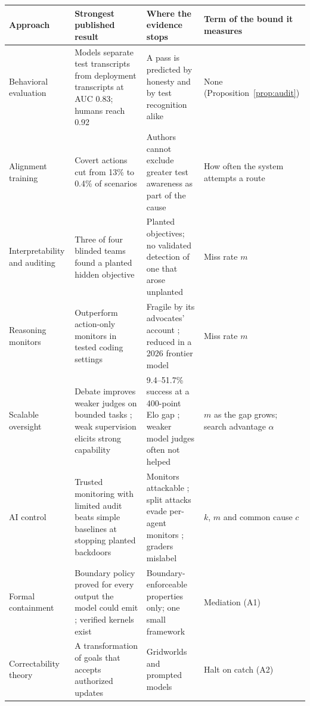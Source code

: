 \documentclass[10pt,twocolumn]{article}
\theoremstyle{plain}
\theoremstyle{definition}
\begin{document}
\begin{table}[t]
\centering
\footnotesize
\setlength{\tabcolsep}{5pt}
\renewcommand{\arraystretch}{1.16}
\begin{tabularx}{\textwidth}{@{}P{1.05in}LLP{1.0in}@{}}
\toprule
\textbf{Approach} & \textbf{Strongest published result} & \textbf{Where the evidence stops} & \textbf{Term of the bound it measures}\\
\midrule
Behavioral evaluation & Models separate test transcripts from deployment transcripts at AUC 0.83; humans reach 0.92 \cite{needham2025} & A pass is predicted by honesty and by test recognition alike \cite{schoen2025} & None (Proposition~\ref{prop:audit})\\
Alignment training & Covert actions cut from 13\% to 0.4\% of scenarios \cite{schoen2025} & Authors cannot exclude greater test awareness as part of the cause & How often the system attempts a route\\
Interpretability and auditing & Three of four blinded teams found a planted hidden objective \cite{marks2025} & Planted objectives; no validated detection of one that arose unplanted & Miss rate $m$\\
Reasoning monitors & Outperform action-only monitors in tested coding settings \cite{baker2025} & Fragile by its advocates' account \cite{korbak2025}; reduced in a 2026 frontier model \cite{openai2026astra} & Miss rate $m$\\
Scalable oversight & Debate improves weaker judges on bounded tasks \cite{khan2024,irving2018}; weak supervision elicits strong capability \cite{burns2024} & 9.4--51.7\% success at a 400-point Elo gap \cite{engels2025}; weaker model judges often not helped \cite{carro2026} & $m$ as the gap grows; search advantage $\alpha$\\
AI control & Trusted monitoring with limited audit beats simple baselines at stopping planted backdoors \cite{greenblatt2024control} & Monitors attackable \cite{terekhov2025}; split attacks evade per-agent monitors \cite{makins2026}; graders mislabel \cite{anthropic2026judges} & $k$, $m$ and common cause $c$\\
Formal containment & Boundary policy proved for every output the model could emit \cite{moon2026}; verified kernels exist \cite{klein2009} & Boundary-enforceable properties only; one small framework & Mediation (A1)\\
Correctability theory & A transformation of goals that accepts authorized updates \cite{hudson2026} & Gridworlds and prompted models & Halt on catch (A2)\\

\end{tabularx}
\end{table}
\end{document}
